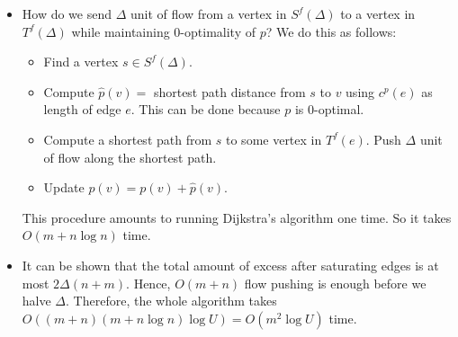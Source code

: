 \documentclass[10pt]{article}
\begin{document}
\begin{itemize}
\begin{proof}
          When $\Delta < 1$, then $A^f(\Delta)$ is the whole graph $G_f$.
          Since $p$ is $0$-optimal, we have that $G_f$ has no negative-cost
          cycle.
        \end{proof}
      
      \item How do we send $\Delta$ unit of flow from a vertex in $S^f(\Delta)$
        to a vertex in $T^f(\Delta)$ while maintaining $0$-optimality of $p$?
        We do this as follows:
        \begin{itemize}
          \item Find a vertex $s \in S^f(\Delta)$.
          \item Compute $\hat{p}(v) = $ shortest path distance from $s$ to $v$
            using $c^p(e)$ as length of edge $e$.
            This can be done because $p$ is $0$-optimal.
          \item Compute a shortest path from $s$ to some vertex in $T^f(e)$.
            Push $\Delta$ unit of flow along the shortest path.
          \item Update $p(v) = p(v) + \hat{p}(v).$
        \end{itemize}
        This procedure amounts to running Dijkstra's algorithm one time. 
        So it takes $O(m + n\log n)$ time.
      
      \item It can be shown that the total amount of excess after saturating
        edges is at most $2\Delta(n+m).$ Hence, $O(m+n)$ flow pushing is enough
        before we halve $\Delta.$ Therefore, the whole algorithm takes
        $O((m+n)(m + n\log n)\log U) = O(m^2 \log U)$ time.
    \end{itemize}
\end{document}

